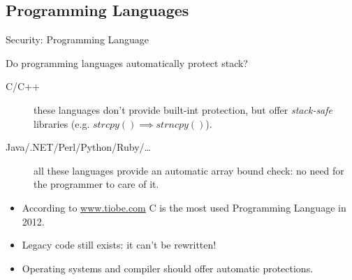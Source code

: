 \subsection{Programming Languages}
\begin{frame}{Security: Programming Language}
	\begin{block}{Do programming languages automatically protect stack?}
		\begin{description}
			\item[C/C++]these languages don't provide built-int protection, but offer
				\emph{stack-safe} libraries (e.g. $strcpy() \implies strncpy()$).
			\item[Java/.NET/Perl/Python/Ruby/\ldots]all these languages provide an
				automatic array bound check: no need for the programmer to care of it.
		\end{description}
		\begin{itemize}
			\item According to \url{www.tiobe.com} C is the most used Programming Language in 2012.
			\item \alert{Legacy code still exists: it can't be rewritten!}
			\item Operating systems and compiler should offer automatic protections.
		\end{itemize}
	\end{block}
\end{frame}


